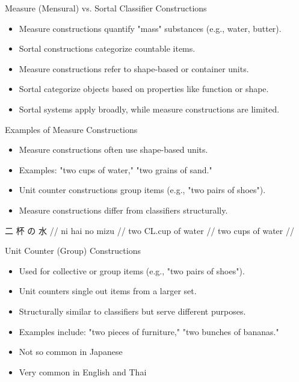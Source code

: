 \documentclass{beamer}
\begin{document}
\begin{frame}{Measure (Mensural) vs. Sortal Classifier Constructions}
\begin{itemize}
    \item Measure constructions quantify "mass" substances (e.g., water, butter).
    \item Sortal constructions categorize countable items.
    \item Measure constructions refer to shape-based or container units.
    \item Sortal categorize objects based on properties like function or shape.
    \item Sortal systems apply broadly, while measure constructions are limited.
\end{itemize}
\end{frame}

\begin{frame}{Examples of Measure Constructions}
\begin{itemize}
    \item Measure constructions often use shape-based units.
    \item Examples: "two cups of water," "two grains of sand."
    \item Unit counter constructions group items (e.g., "two pairs of shoes").
    \item Measure constructions differ from classifiers structurally.
\end{itemize}
\ex
\begingl
\gla 二 杯 の 水 //
\glb ni hai no mizu //
\glc two CL.cup of water //
\glft two cups of water //
\endgl
\xe
\end{frame}

\begin{frame}{Unit Counter (Group) Constructions}
\begin{itemize}
    \item Used for collective or group items (e.g., "two pairs of shoes").
    \item Unit counters single out items from a larger set.
    \item Structurally similar to classifiers but serve different purposes.
    \item Examples include: "two pieces of furniture," "two bunches of bananas."
    \item Not so common in Japanese
    \item Very common in English and Thai
\end{itemize}
\end{frame}
\end{document}

